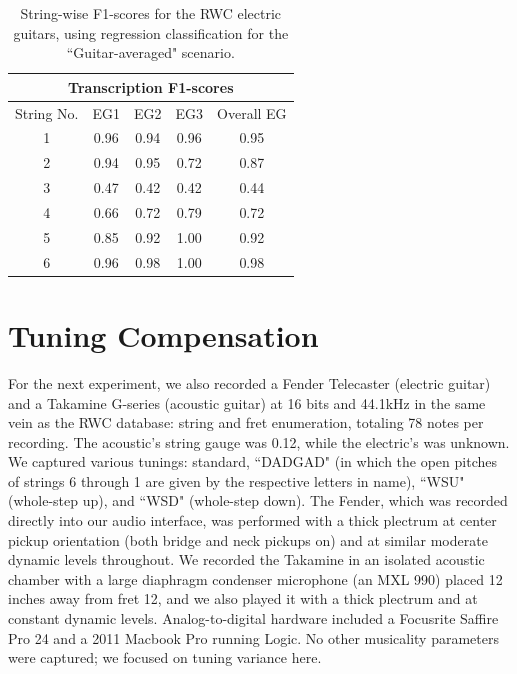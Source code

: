 \documentclass[12pt]{cmuthesis}
\begin{document}
\begin{table}[!htbp]
\begin{center}
\begin{tabular}{||c||c|c|c|c||}
\hline
\multicolumn{5}{||c||}{\bf{Transcription F1-scores}} \\
\hline
String No. & EG1 & EG2 & EG3 & Overall EG\\
\hline
1 & 0.96 & 0.94 & 0.96 & 0.95 \\
\hline
2 & 0.94 & 0.95 & 0.72 & 0.87\\
\hline
3 & 0.47 & 0.42 & 0.42 &  0.44\\
\hline
4 & 0.66 & 0.72 & 0.79 &  0.72\\
\hline
5 & 0.85 & 0.92 & 1.00 &  0.92 \\
\hline
6 & 0.96 & 0.98 & 1.00 &  0.98 \\ 
\hline
\hline
\end{tabular}
\caption{String-wise F1-scores for the RWC electric guitars, using regression classification for the ``Guitar-averaged" scenario.} 
\label{tab:eg-str-f}
\end{center}
\end{table}

\section{Tuning Compensation}
For the next experiment, we also recorded a Fender Telecaster (electric guitar) and a Takamine G-series (acoustic guitar) at 16 bits and 44.1kHz in the same vein as the RWC database: string and fret enumeration, totaling 78 notes per recording. The acoustic's string gauge was 0.12, while the electric's was unknown. We captured various tunings: standard, ``DADGAD" (in which the open pitches of strings 6 through 1 are given by the respective letters in name), ``WSU" (whole-step up), and ``WSD" (whole-step down). The Fender, which was recorded directly into our audio interface, was performed with a thick plectrum at center pickup orientation (both bridge and neck pickups on) and at similar moderate dynamic levels throughout. We recorded the Takamine in an isolated acoustic chamber with a large diaphragm condenser microphone (an MXL 990) placed 12 inches away from fret 12, and we also played it with a thick plectrum and at constant dynamic levels. Analog-to-digital hardware included a Focusrite Saffire Pro 24 and a 2011 Macbook Pro running Logic. No other musicality parameters were captured; we focused on tuning variance here.
\end{document}
